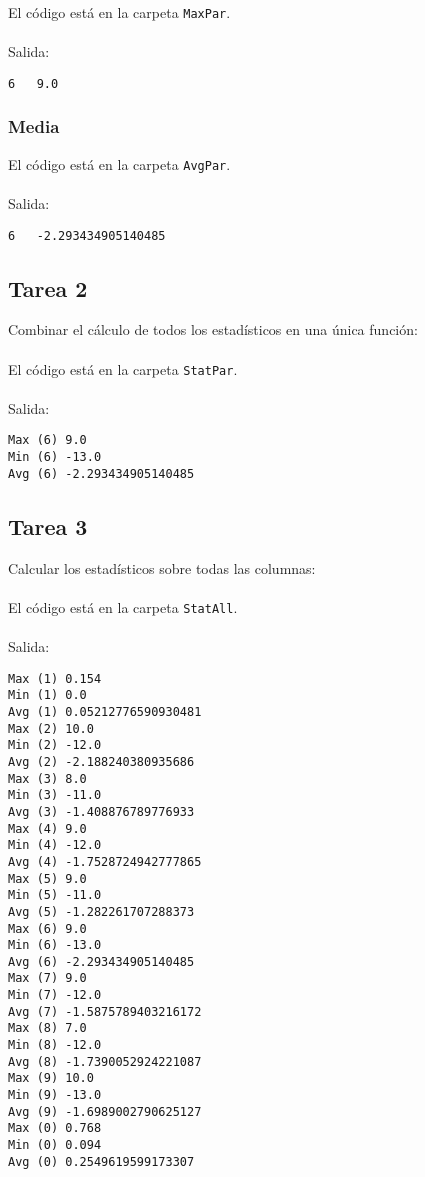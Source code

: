 El código está en la carpeta \texttt{MaxPar}.
\\ \\
Salida:

\begin{lstlisting}
6   9.0
\end{lstlisting}

\subsubsection{Media}

El código está en la carpeta \texttt{AvgPar}.
\\ \\
Salida:

\begin{lstlisting}
6   -2.293434905140485
\end{lstlisting}

\subsection{Tarea 2}

Combinar el cálculo de todos los estadísticos en una única función:
\\ \\
El código está en la carpeta \texttt{StatPar}.
\\ \\
Salida:

\begin{lstlisting}
Max (6) 9.0
Min (6) -13.0
Avg (6) -2.293434905140485
\end{lstlisting}

\subsection{Tarea 3}

Calcular los estadísticos sobre todas las columnas:
\\ \\
El código está en la carpeta \texttt{StatAll}.
\\ \\
Salida:

\begin{lstlisting}
Max (1) 0.154
Min (1) 0.0
Avg (1) 0.05212776590930481
Max (2) 10.0
Min (2) -12.0
Avg (2) -2.188240380935686
Max (3) 8.0
Min (3) -11.0
Avg (3) -1.408876789776933
Max (4) 9.0
Min (4) -12.0
Avg (4) -1.7528724942777865
Max (5) 9.0
Min (5) -11.0
Avg (5) -1.282261707288373
Max (6) 9.0
Min (6) -13.0
Avg (6) -2.293434905140485
Max (7) 9.0
Min (7) -12.0
Avg (7) -1.5875789403216172
Max (8) 7.0
Min (8) -12.0
Avg (8) -1.7390052924221087
Max (9) 10.0
Min (9) -13.0
Avg (9) -1.6989002790625127
Max (0) 0.768
Min (0) 0.094
Avg (0) 0.2549619599173307
\end{lstlisting}

